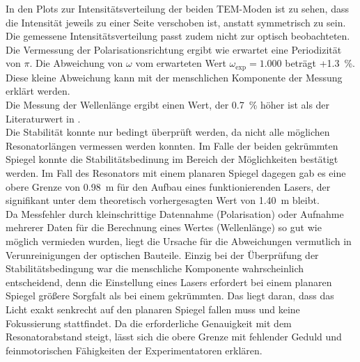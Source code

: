 In den Plots zur Intensitätsverteilung der beiden TEM-Moden ist zu sehen, dass die Intensität jeweils zu einer Seite verschoben ist, anstatt symmetrisch zu sein. Die gemessene Intensitätsverteilung passt zudem nicht zur optisch beobachteten. \\
Die Vermessung der Polarisationsrichtung ergibt wie erwartet eine Periodizität von $\pi$. Die Abweichung von $\omega$ vom erwarteten Wert $\omega_\text{exp}=1.000$ beträgt +\SI{1.3}{\%}. Diese kleine Abweichung kann mit der menschlichen Komponente der Messung erklärt werden. \\
Die Messung der Wellenlänge ergibt einen Wert, der \SI{0.7}{\%} höher ist als der Literaturwert in \cite{V61}. \\
Die Stabilität konnte nur bedingt überprüft werden, da nicht alle möglichen Resonatorlängen vermessen werden konnten. Im Falle der beiden gekrümmten Spiegel konnte die Stabilitätsbedinung im Bereich der Möglichkeiten bestätigt werden. Im Fall des Resonators mit einem planaren Spiegel dagegen gab es eine obere Grenze von \SI{0.98}{\metre} für den Aufbau eines funktionierenden Lasers, der signifikant unter dem theoretisch vorhergesagten Wert von \SI{1.40}{\metre} bleibt. \\
Da Messfehler durch kleinschrittige Datennahme (Polarisation) oder Aufnahme mehrerer Daten für die Berechnung eines Wertes (Wellenlänge) so gut wie möglich vermieden wurden, liegt die Ursache für die Abweichungen vermutlich in Verunreinigungen der optischen Bauteile. Einzig bei der Überprüfung der Stabilitätsbedingung war die menschliche Komponente wahrscheinlich entscheidend, denn die Einstellung eines Lasers erfordert bei einem planaren Spiegel größere Sorgfalt als bei einem gekrümmten. Das liegt daran, dass das Licht exakt senkrecht auf den planaren Spiegel fallen muss und keine Fokussierung stattfindet. Da die erforderliche Genauigkeit mit dem Resonatorabstand steigt, lässt sich die obere Grenze mit fehlender Geduld und feinmotorischen Fähigkeiten der Experimentatoren erklären.